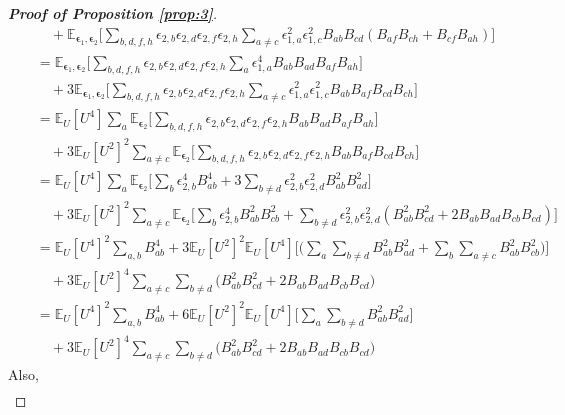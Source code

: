 \documentclass{article}
\theoremstyle{definition}
\theoremstyle{remark}
\begin{document}
\begin{proof}[\textbf{Proof of Proposition \ref{prop:3}}]
\begin{eqnarray*}
			&&\quad+\mathbb{E}_{\bm{\epsilon}_{1},\bm{\epsilon}_{2}}\Big[\sum_{b,d,f,h}{\epsilon}_{2,b}{\epsilon}_{2,d}{\epsilon}_{2,f}{\epsilon}_{2,h}\sum_{a\ne c}{\epsilon}_{1,a}^{2}{\epsilon}_{1,c}^{2}B_{ab}B_{cd}(B_{af}B_{ch}+B_{cf}B_{ah})\Big]\\
			&&=\mathbb{E}_{\bm{\epsilon}_{1},\bm{\epsilon}_{2}}\Big[\sum_{b,d,f,h}{\epsilon}_{2,b}{\epsilon}_{2,d}{\epsilon}_{2,f}{\epsilon}_{2,h}\sum_{a}{\epsilon}_{1,a}^{4}B_{ab}B_{ad}B_{af}B_{ah}\Big]\\
			&&\quad+3\mathbb{E}_{\bm{\epsilon}_{1},\bm{\epsilon}_{2}}\Big[\sum_{b,d,f,h}{\epsilon}_{2,b}{\epsilon}_{2,d}{\epsilon}_{2,f}{\epsilon}_{2,h}\sum_{a\ne c}{\epsilon}_{1,a}^{2}{\epsilon}_{1,c}^{2}B_{ab}B_{af}B_{cd}B_{ch}\Big]\\
			&&=\mathbb{E}_{U}[U^{4}]\sum_{a}\mathbb{E}_{\bm{\epsilon}_{2}}\Big[\sum_{b,d,f,h}{\epsilon}_{2,b}{\epsilon}_{2,d}{\epsilon}_{2,f}{\epsilon}_{2,h}B_{ab}B_{ad}B_{af}B_{ah}\Big]\\
			&&\quad+3\mathbb{E}_{U}[U^{2}]^{2}\sum_{a\ne c}\mathbb{E}_{\bm{\epsilon}_{2}}\Big[\sum_{b,d,f,h}{\epsilon}_{2,b}{\epsilon}_{2,d}{\epsilon}_{2,f}{\epsilon}_{2,h}B_{ab}B_{af}B_{cd}B_{ch}\Big]\\
			&&=\mathbb{E}_{U}[U^{4}]\sum_{a}\mathbb{E}_{\bm{\epsilon}_{2}}\Big[\sum_{b}{\epsilon}_{2,b}^{4}B_{ab}^{4}+3\sum_{b\ne d}{\epsilon}_{2,b}^{2}{\epsilon}_{2,d}^{2}B_{ab}^{2}B_{ad}^{2}\Big]\\
			&&\quad+3\mathbb{E}_{U}[U^{2}]^{2}\sum_{a\ne c}\mathbb{E}_{\bm{\epsilon}_{2}}\Big[\sum_{b}{\epsilon}_{2,b}^{4}B_{ab}^{2}B_{cb}^{2}+\sum_{b\ne d}{\epsilon}_{2,b}^{2}{\epsilon}_{2,d}^{2}(B_{ab}^{2}B_{cd}^{2}+2B_{ab}B_{ad}B_{cb}B_{cd})\Big]\\
			&&=\mathbb{E}_{U}[U^{4}]^{2}\sum_{a,b}B_{ab}^{4}+3\mathbb{E}_{U}[U^{2}]^{2}\mathbb{E}_{U}[U^{4}]\Big[\Big(\sum_{a}\sum_{b\ne d}B_{ab}^{2}B_{ad}^{2}+\sum_{b}\sum_{a\ne c}B_{ab}^{2}B_{cb}^{2}\Big)\Big]\\
			&&\quad+3\mathbb{E}_{U}[U^{2}]^{4}\sum_{a\ne c}\sum_{b\ne d}\Big(B_{ab}^{2}B_{cd}^{2}+2B_{ab}B_{ad}B_{cb}B_{cd}\Big)\\
			&&=\mathbb{E}_{U}[U^{4}]^{2}\sum_{a,b}B_{ab}^{4}+6\mathbb{E}_{U}[U^{2}]^{2}\mathbb{E}_{U}[U^{4}]\Big[\sum_{a}\sum_{b\ne d}B_{ab}^{2}B_{ad}^{2}\Big]\\
			&&\quad+3\mathbb{E}_{U}[U^{2}]^{4}\sum_{a\ne c}\sum_{b\ne d}\Big(B_{ab}^{2}B_{cd}^{2}+2B_{ab}B_{ad}B_{cb}B_{cd}\Big)
		\end{eqnarray*}
		Also,
		\begin{eqnarray*}

\end{eqnarray*}
\end{proof}
\end{document}
